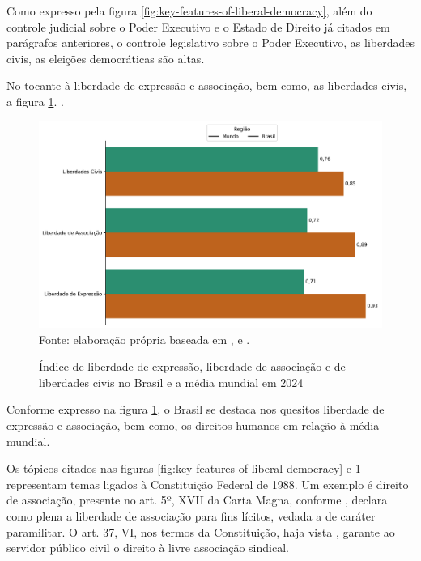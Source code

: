 Como expresso pela figura \ref{fig:key-features-of-liberal-democracy}, além do controle judicial sobre o Poder Executivo e o Estado de Direito já citados em parágrafos anteriores, o controle legislativo sobre o Poder Executivo, as liberdades civis, as eleições democráticas são altas.

No tocante à liberdade de expressão e associação, bem como, as liberdades civis, a figura \ref{fig:comparacao_liberdade_expressao_associacao_dh}.
.
\begin{figure}[H]
	\centering
	\caption{Índice de liberdade de expressão, liberdade de associação e de liberdades civis no Brasil e a média mundial em 2024}
	\includegraphics[width=1\linewidth]{figuras/comparacao_liberdade_expressao_associacao_dh.png}
	\label{fig:comparacao_liberdade_expressao_associacao_dh}
	\footnotesize{Fonte: elaboração própria baseada em \cite{freedom-of-association-index}, \cite{freedom-of-expression-index} e \cite{human-rights-index-vdem}.}
\end{figure}

Conforme expresso na figura \ref{fig:comparacao_liberdade_expressao_associacao_dh}, o Brasil se destaca nos quesitos liberdade de expressão e associação, bem como, os direitos humanos em relação à média mundial.

Os tópicos citados nas figuras \ref{fig:key-features-of-liberal-democracy} e \ref{fig:comparacao_liberdade_expressao_associacao_dh} representam temas ligados à Constituição Federal de 1988. Um exemplo é direito de associação, presente no art. 5º, XVII da Carta Magna, conforme \cite{cf88}, declara como plena a liberdade de associação para fins lícitos, vedada a de caráter paramilitar. O art. 37, VI, nos termos da Constituição, haja vista \cite{cf88}, garante ao servidor público civil o direito à livre associação sindical.

